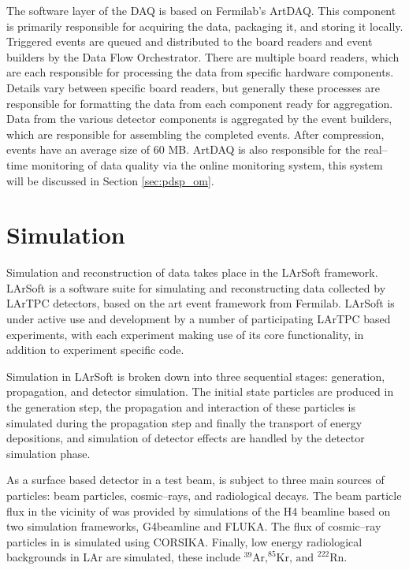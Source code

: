 The software layer of the \protodune{} DAQ is based on Fermilab's 
ArtDAQ\cite{6495515}. This component is primarily responsible for acquiring 
the data, packaging it, and storing it locally. Triggered events are queued 
and distributed to the board readers and event builders by the Data Flow 
Orchestrator. There are multiple board readers, which are each responsible for 
processing the data from specific hardware components. Details vary between 
specific board readers, but generally these processes are responsible for 
formatting the data from each component ready for aggregation. Data from the 
various detector components is aggregated by the event builders, which are 
responsible for assembling the completed events. After compression, events have 
an average size of 60 MB. ArtDAQ is also responsible for the real--time 
monitoring of data quality via the online monitoring system, this system will 
be discussed in Section \ref{sec:pdsp_om}.

\section{Simulation} \label{sec:simulation}

Simulation and reconstruction of \protodune{} data takes place in the LArSoft
framework\cite{Snider2017}. LArSoft is a software suite for simulating and
reconstructing data collected by LArTPC detectors, based on the art event 
framework from Fermilab\cite{Green:2012gv}. LArSoft is under active use and
development by a number of participating LArTPC based experiments, with each
experiment making use of its core functionality, in addition to experiment 
specific code. 

Simulation in LArSoft is broken down into three sequential stages: generation,
propagation, and detector simulation. The initial state particles are produced
in the generation step, the propagation and interaction of these particles is 
simulated during the propagation step and finally the transport of energy 
depositions, and simulation of detector effects are handled by the detector 
simulation phase.

As a surface based detector in a test beam, \protodune{} is subject to three
main sources of particles: beam particles, cosmic--rays, and radiological 
decays. The beam particle flux in the vicinity of \protodune{} was provided by 
simulations of the H4 beamline\cite{Booth:2019brj} based on two simulation 
frameworks, G4beamline\cite{g4beamline} and FLUKA\cite{BOHLEN2014211}. The flux
of cosmic--ray particles in \protodune{} is simulated using 
CORSIKA\cite{Heck:1998vt}.  Finally, low energy radiological backgrounds in 
LAr are simulated, these include $^{39}\mbox{Ar,} ^ {85}\mbox{Kr, and } 
^{222}\mbox{Rn}$.

